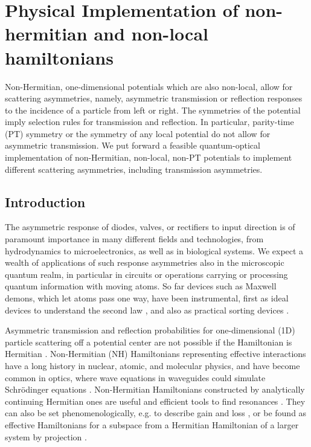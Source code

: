 
\chapter{Physical Implementation of non-hermitian and non-local hamiltonians}
\label{Chapter3}
%
Non-Hermitian, one-dimensional  potentials which are also non-local,
allow for scattering asymmetries, namely, asymmetric transmission or reflection responses to the incidence of a particle from left or right.
The  symmetries of the potential
imply selection rules for transmission and reflection. In particular, parity-time (PT)
symmetry or the symmetry  of any local potential do not allow for asymmetric transmission.
We put forward a feasible  quantum-optical implementation
of non-Hermitian, non-local, non-PT potentials to implement different scattering asymmetries, including transmission
asymmetries.
%
\newpage
%
\section{Introduction}
The asymmetric response of diodes, valves, or rectifiers to input direction is of paramount importance in many different fields and technologies, from hydrodynamics  to microelectronics,  as well as in biological systems. We  expect a wealth of applications of such response asymmetries also in the microscopic quantum realm, in particular in  circuits or operations carrying or processing quantum information with moving atoms.
So far  devices such as Maxwell demons, which  let atoms pass one way, have  been instrumental, first as ideal devices to  understand the second law \cite{Maxwell1875,Rex1990}, and also  as practical sorting devices \cite{Ruschhaupt2004,Raizen2005,Dudarev2005,Ruschhaupt2006a,Ruschhaupt2006,Ruschhaupt2006b,Ruschhaupt2007,Raizen2009,Jerkins2010}.

Asymmetric transmission and reflection
probabilities for one-dimensional (1D) particle scattering off  a potential center are not possible if the Hamiltonian is Hermitian \cite{Muga2004,Mostafazadeh2018}.
Non-Hermitian (NH) Hamiltonians representing effective interactions have a long history in nuclear, atomic, and molecular physics, and have become common in optics, where wave equations in waveguides could simulate  Schr\"odinger equations \cite{Ruschhaupt2005,Longhi2017a,Konotop2016}.
%
Non-Hermitian Hamiltonians constructed by analytically continuing Hermitian ones are useful and efficient tools to find resonances \cite{Moiseyev2011}.
They can also be set phenomenologically, e.g. to describe gain and loss
\cite{Ruschhaupt2005},
or be found as effective Hamiltonians for a subspace from a Hermitian Hamiltonian of a larger system
by projection \cite{Feshbach1958,Ruschhaupt2004,Muga2004}.
%

